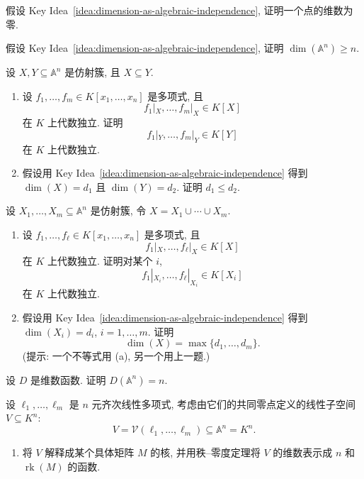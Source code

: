 \BookExerciseHeading
\begin{BookExercises}
  \item\label{ex:point-has-dimension-zero-by-independence} 假设 Key Idea~\ref{idea:dimension-as-algebraic-independence}, 证明一个点的维数为零.
  \item\label{ex:affine-space-dimension-lower-bound} 假设 Key Idea~\ref{idea:dimension-as-algebraic-independence}, 证明 $\dim(\mathbb{A}^{n})\geq n$.
  \item\label{ex:dimension-monotonic-by-independence} 设 $X,Y\subseteq\mathbb{A}^{n}$ 是仿射簇, 且 $X\subseteq Y$.
  \begin{enumerate}
    \item 设 $f_{1},\ldots,f_{m}\in K[x_{1},\ldots,x_{n}]$ 是多项式, 且
    \[
      f_{1}|_{X},\ldots,f_{m}|_{X}\in K[X]
    \]
    在 $K$ 上代数独立. 证明
    \[
      f_{1}|_{Y},\ldots,f_{m}|_{Y}\in K[Y]
    \]
    在 $K$ 上代数独立.
    \item 假设用 Key Idea~\ref{idea:dimension-as-algebraic-independence} 得到 $\dim(X)=d_{1}$ 且 $\dim(Y)=d_{2}$. 证明 $d_{1}\leq d_{2}$.
  \end{enumerate}
  \item\label{ex:dimension-of-union-by-independence} 设 $X_{1},\ldots,X_{m}\subseteq\mathbb{A}^{n}$ 是仿射簇, 令 $X=X_{1}\cup\cdots\cup X_{m}$.
  \begin{enumerate}
    \item 设 $f_{1},\ldots,f_{\ell}\in K[x_{1},\ldots,x_{n}]$ 是多项式, 且
    \[
      f_{1}|_{X},\ldots,f_{\ell}|_{X}\in K[X]
    \]
    在 $K$ 上代数独立. 证明对某个 $i$,
    \[
      f_{1}|_{X_{i}},\ldots,f_{\ell}|_{X_{i}}\in K[X_{i}]
    \]
    在 $K$ 上代数独立.
    \item 假设用 Key Idea~\ref{idea:dimension-as-algebraic-independence} 得到 $\dim(X_{i})=d_{i}$, $i=1,\ldots,m$. 证明
    \[
      \dim(X)=\max\{d_{1},\ldots,d_{m}\}.
    \]
    (提示: 一个不等式用 (a), 另一个用上一题.)
  \end{enumerate}
  \item\label{ex:dimension-function-of-affine-space} 设 $D$ 是维数函数. 证明 $D(\mathbb{A}^{n})=n$.
  \item\label{ex:dimension-axiom-vector-space-analogue} 设 $\ell_{1},\ldots,\ell_{m}$ 是 $n$ 元齐次线性多项式, 考虑由它们的共同零点定义的线性子空间 $V\subseteq K^{n}$:
  \[
    V=\mathcal{V}(\ell_{1},\ldots,\ell_{m})\subseteq\mathbb{A}^{n}=K^{n}.
  \]
  \begin{enumerate}
    \item 将 $V$ 解释成某个具体矩阵 $M$ 的核, 并用秩--零度定理将 $V$ 的维数表示成 $n$ 和 $\operatorname{rk}(M)$ 的函数.

\end{enumerate}
\end{BookExercises}
